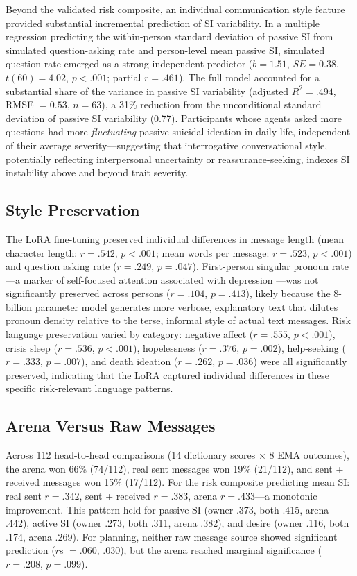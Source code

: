 \documentclass[review,12pt,authoryear]{elsarticle}
\begin{document}
Beyond the validated risk composite, an individual communication style feature provided substantial incremental prediction of SI variability. In a multiple regression predicting the within-person standard deviation of passive SI from simulated question-asking rate and person-level mean passive SI, simulated question rate emerged as a strong independent predictor ($b = 1.51$, $SE = 0.38$, $t(60) = 4.02$, $p < .001$; partial $r = .461$). The full model accounted for a substantial share of the variance in passive SI variability (adjusted $R^2 = .494$, RMSE $= 0.53$, $n = 63$), a 31\% reduction from the unconditional standard deviation of passive SI variability (0.77). Participants whose agents asked more questions had more \textit{fluctuating} passive suicidal ideation in daily life, independent of their average severity---suggesting that interrogative conversational style, potentially reflecting interpersonal uncertainty or reassurance-seeking, indexes SI instability above and beyond trait severity.

\subsection{Style Preservation}

The LoRA fine-tuning preserved individual differences in message length (mean character length: $r = .542$, $p < .001$; mean words per message: $r = .523$, $p < .001$) and question asking rate ($r = .249$, $p = .047$). First-person singular pronoun rate---a marker of self-focused attention associated with depression \citep{rude2004language}---was not significantly preserved across persons ($r = .104$, $p = .413$), likely because the 8-billion parameter model generates more verbose, explanatory text that dilutes pronoun density relative to the terse, informal style of actual text messages. Risk language preservation varied by category: negative affect ($r = .555$, $p < .001$), crisis sleep ($r = .536$, $p < .001$), hopelessness ($r = .376$, $p = .002$), help-seeking ($r = .333$, $p = .007$), and death ideation ($r = .262$, $p = .036$) were all significantly preserved, indicating that the LoRA captured individual differences in these specific risk-relevant language patterns.

\subsection{Arena Versus Raw Messages}

Across 112 head-to-head comparisons (14 dictionary scores $\times$ 8 EMA outcomes), the arena won 66\% (74/112), real sent messages won 19\% (21/112), and sent + received messages won 15\% (17/112). For the risk composite predicting mean SI: real sent $r = .342$, sent + received $r = .383$, arena $r = .433$---a monotonic improvement. This pattern held for passive SI (owner .373, both .415, arena .442), active SI (owner .273, both .311, arena .382), and desire (owner .116, both .174, arena .269). For planning, neither raw message source showed significant prediction ($r$s $= .060$, $.030$), but the arena reached marginal significance ($r = .208$, $p = .099$).
\end{document}

